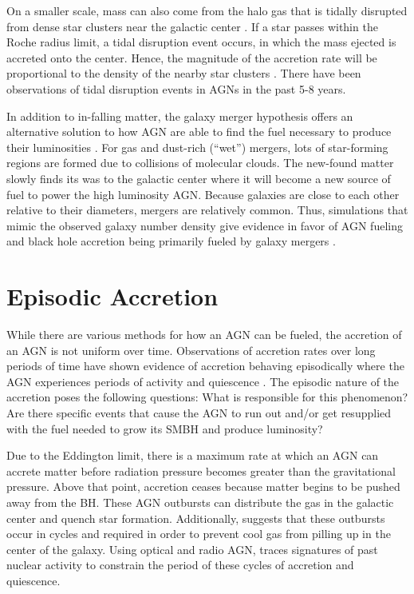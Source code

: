 On a smaller scale, mass can also come from the halo gas that is tidally disrupted from dense star clusters near the galactic center \citep{frank1979}.
If a star passes within the Roche radius limit, a tidal disruption event occurs, in which the mass ejected is accreted onto the center.
Hence, the magnitude of the accretion rate will be proportional to the density of the nearby star clusters \citep{Hills1975}.
There have been observations of tidal disruption events in AGNs in the past 5-8 years.

In addition to in-falling matter, the galaxy merger hypothesis offers an alternative solution to how AGN are able to find the fuel necessary to produce their luminosities \citep{Sanders1996}.
 For gas and dust-rich (“wet”) mergers, lots of star-forming regions are formed due to collisions of molecular clouds.
The new-found matter slowly finds its was to the galactic center where it will become a new source of fuel to power the high luminosity AGN.
Because galaxies are close to each other relative to their diameters, mergers are relatively common.
Thus, simulations that mimic the observed galaxy number density give evidence in favor of AGN fueling and black hole accretion being primarily fueled by galaxy mergers \citep{DiMatteo2005}. 

\section{Episodic Accretion}
\label{sub1_4}

While there are various methods for how an AGN can be fueled, the accretion of an AGN is not uniform over time.
Observations of accretion rates over long periods of time have shown evidence of accretion behaving episodically where the AGN experiences periods of activity and quiescence \citep{SaikiaAndJamrozy2009}.
The episodic nature of the accretion poses the following questions: What is responsible for this phenomenon? 
Are there specific events that cause the AGN to run out and/or get resupplied with the fuel needed to grow its SMBH and produce luminosity?

Due to the Eddington limit, there is a maximum rate at which an AGN can accrete matter before radiation pressure becomes greater than the gravitational pressure. 
Above that point, accretion ceases because matter begins to be pushed away from the BH.
These AGN outbursts can distribute the gas in the galactic center and quench star formation.
Additionally, \cite{morganti2017} suggests that these outbursts occur in cycles and required in order to prevent cool gas from pilling up in the center of the galaxy. 
Using optical and radio AGN, \cite{morganti2017} traces signatures of past nuclear activity to constrain the period of these cycles of accretion and quiescence.

